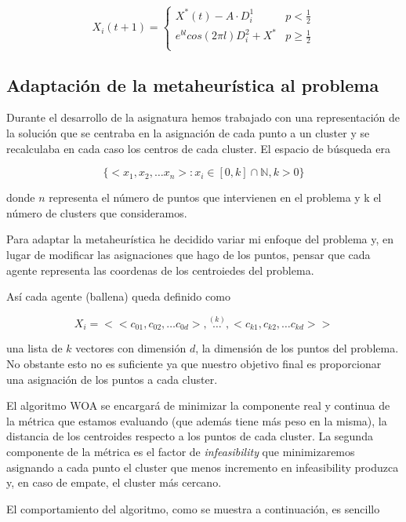 \documentclass[11pt]{article}
\begin{document}
\[
    X_i(t+1) =  
\begin{cases}
    X^*(t) - A\cdot D^1_i & p < \frac{1}{2}\\
    e^{bl}cos(2\pi l)D^2_i + X^*  & p\geq \frac{1}{2}\\  
\end{cases}
\]

\subsection{Adaptación de la metaheurística al problema}

Durante el desarrollo de la asignatura hemos trabajado con una representación
de la solución que se centraba en la asignación de cada punto a un cluster
y se recalculaba en cada caso los centros de cada cluster. El espacio de búsqueda 
era 

\[
    \{<x_1, x_2, \dots x_n >: x_i \in [0, k] \cap \mathbb{N}, k > 0\}
\]

donde $n$ representa el número de puntos que intervienen en el problema y k el número 
de clusters que consideramos.

Para adaptar la metaheurística he decidido variar mi enfoque del problema y, en
lugar de modificar las asignaciones que hago de los puntos, pensar que cada
agente representa las coordenas de los centroiedes del problema.

Así cada agente (ballena) queda definido como 

\[
    X_i = <<c_{01},c_{02}, \dots c_{0d}>, \overset{(k)}{\dots}, <c_{k1},c_{k2},\dots c_{kd}>>    
\]

una lista de $k$ vectores con dimensión $d$, la dimensión de los puntos del
problema. No obstante esto no es suficiente ya que nuestro objetivo final es 
proporcionar una asignación de los puntos a cada cluster. 

El algoritmo WOA se encargará de minimizar la componente real y continua de la
métrica que estamos evaluando (que además tiene más peso en la misma), la
distancia de los centroides respecto a los puntos de cada cluster. La segunda
componente de la métrica es el factor de \textit{infeasibility} que
minimizaremos asignando a cada punto el cluster que menos incremento en
infeasibility produzca y, en caso de empate, el cluster más cercano.

El comportamiento del algoritmo, como se muestra a continuación, es sencillo 
\end{document}
